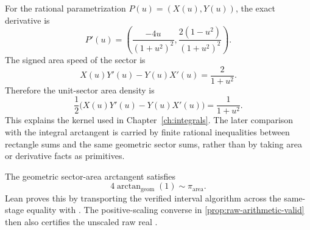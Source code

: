 \begin{theorem}
\label{thm:sector-area-density}
\leanok
For the rational parametrization \(P(u)=(X(u),Y(u))\), the exact derivative is
\[
  P'(u)=
  \left(
    \frac{-4u}{(1+u^2)^2},
    \frac{2(1-u^2)}{(1+u^2)^2}
  \right).
\]
The signed area speed of the sector is
\[
  X(u)Y'(u)-Y(u)X'(u)=\frac{2}{1+u^2}.
\]
Therefore the unit-sector area density is
\[
  \frac12\bigl(X(u)Y'(u)-Y(u)X'(u)\bigr)
  =
  \frac{1}{1+u^2}.
\]
This explains the kernel used in Chapter~\ref{ch:integrals}.  The later
comparison with the integral arctangent is carried by finite rational
inequalities between rectangle sums and the same geometric sector sums, rather
than by taking area or derivative facts as primitives.
\end{theorem}

\begin{theorem}
\label{thm:geometric-arctan-one-area-pi}
The geometric sector-area arctangent satisfies
\[
  4\arctan_{\mathrm{geom}}(1)\sim \pi_{\mathrm{area}}.
\]
Lean proves this by transporting the verified  interval
algorithm across the same-stage equality with .
The positive-scaling converse in \cref{prop:raw-arithmetic-valid} then also
certifies the unscaled raw real .
\end{theorem}

